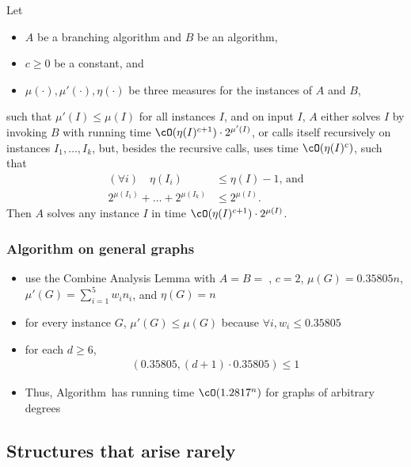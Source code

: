 \begin{frame}

\begin{lemma}
Let
\begin{itemize}
 \item $A$ be a branching algorithm and $B$ be an algorithm,
 \item $c \ge 0$ be a constant, and
 \item $\mu(\cdot), \mu'(\cdot), \eta(\cdot)$ be three measures
 for the instances of $A$ and $B$,
\end{itemize}
such that $\mu'(I) \le \mu(I)$ for all instances $I$, and
on input $I$, $A$ either solves $I$ by invoking $B$ with running time $\cO(\eta(I)^{c+1}) \cdot 2^{\mu'(I)}$, or calls itself recursively on instances $I_1,\ldots,I_k$, but, besides the recursive calls, uses time $\cO(\eta(I)^c)$, such that
\begin{align}
(\forall i) \quad \eta(I_i) & \leq \eta(I)-1 \text{, and}
  \\
2^{\mu(I_1)} + \ldots + 2^{\mu(I_k)} & \leq 2^{\mu(I)} .
\end{align}
Then $A$ solves any instance $I$
in time $\cO(\eta(I)^{c+1}) \cdot 2^{\mu(I)}$.
\end{lemma}
\end{frame}

\begin{frame}
 \frametitle{Algorithm \algmis on general graphs}
 
 \begin{itemize}
  \item use the Combine Analysis Lemma with $A=B=\;$\algmis, $c=2$, $\mu(G)= 0.35805 n$, $\mu'(G)=\sum_{i=1}^5 w_i n_i$, and $\eta(G)=n$
  \item for every instance $G$, $\mu'(G) \le \mu(G)$ because $\forall i, w_i \le 0.35805$
  \item for each $d \ge 6$,
    \begin{align*}
      \left( 0.35805, (d+1) \cdot 0.35805 \right) \le 1
    \end{align*}
  \item Thus, Algorithm~\algmis has running time $\cO(1.2817^n)$ for graphs of arbitrary degrees
 \end{itemize}
\end{frame}

\subsection{Structures that arise rarely}


